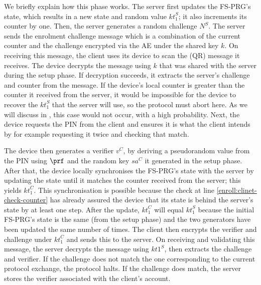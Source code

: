 \documentclass[runningheads]{llncs}
\newcommand{\sss}{\scriptscriptstyle}
\newcommand{\nonce}{\ensuremath{{N}}}
\newcommand{\keyt}{\ensuremath{{kt}}}
\newcommand{\salt}{\ensuremath{{sa}}}
\renewcommand{\verifier}{\ensuremath{{v}}}
\newcommand{\VC}[1]{\ensuremath{#1^{\sss C}}}
\newcommand{\VS}[1]{\ensuremath{#1^{\sss S}}}
\begin{document}
We briefly explain how this phase works.  The server first updates the FS-PRG's state, which results in a new state and random value \VS{\keyt_{\sss 1}}; it also increments its counter by one. Then, the server generates a random challenge \VS{\nonce}. The server sends the enrolment challenge message which is a combination of the current counter and the challenge encrypted via the AE under the shared key $k$.
%
 On receiving this message, the client uses its device to scan the (QR) message it receives. The device decrypts the message using $k$ that was shared with the server during the setup phase.  If decryption succeeds, it  extracts the server's challenge and counter from the message.  If the device's local counter is greater than the counter it received from the server, it would be impossible for the device to recover the $\VS{\keyt_{\sss 1}}$ that the server will use, so the protocol must abort here. As we will discuss in , this case would not occur, with a high probability. Next, the device requests the PIN from the client and ensures it is what the client intends by for example requesting it twice and checking that match.



The device then generates a verifier $\VC{\verifier}$, by deriving a pseudorandom value from the PIN using $\prf$ and the random key $\VC{\salt}$ it generated in the setup phase.  After that, the device locally synchronises the FS-PRG's state with the server by updating the state until it matches the counter received from the server; this yields \VC{\keyt_{\sss 1}}. This synchronisation is possible because the check at line \ref{enroll:clinet-check-counter} has already assured the device that its state is behind the server's state by at least one step. After the update, \VC{\keyt_{\sss 1}} will equal \VS{\keyt_{\sss 1}} because the initial FS-PRG's state is the same (from the setup phase) and the two generators have been updated the same number of times. The client then encrypts the verifier and challenge under \VC{\keyt_{\sss 1}} and sends this to the server.
%
%
On receiving and validating this message, the server decrypts the message using \VS{\keyt{\sss 1}}, then extracts the challenge and verifier.
If the challenge does not match the one corresponding to the current protocol exchange, the protocol halts.
If the challenge does match, the server stores the verifier associated with the client's account.
\end{document}
